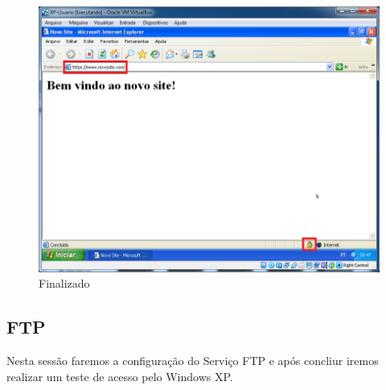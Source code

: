 \documentclass[10pt]{article}
\begin{document}
\begin{figure}[H]
    \centering
    \caption{Finalizado}
    \label{fig:5532057}
    \includegraphics[width=\linewidth]{images/IIS/criando_um_novo_site/057.png}
\end{figure}

\subsection{FTP}
\par Nesta sessão faremos a configuração do Serviço FTP e após concliur iremos realizar um teste de acesso pelo Windows XP.
\end{document}
